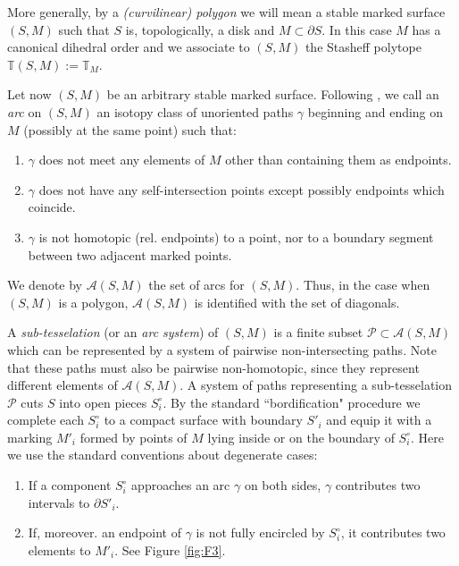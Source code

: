 \documentclass[english,11pt,leqno]{article}
\def\TT{{\mathbb{T}}}
\def\Ac{\mathcal{A}}
\def\Pc{\mathcal{P}}
\theoremstyle{definition}
\theoremstyle{remark}
\numberwithin{equation}{section}
\begin{document}
 More generally, by a {\em (curvilinear) polygon} we will mean a stable marked
 surface $(S,M)$ such that $S$ is, topologically,  a disk and $M\subset\partial S$. In  this
 case $M$ has a canonical dihedral order and we associate to $(S,M)$ the
 Stasheff polytope $\TT(S,M):= \TT_M$. 
 
 Let now $(S,M)$ be an arbitrary stable marked surface. Following \cite{harer, fomin-shapiro-thurston},
 we call an {\em arc} on $(S,M)$ an isotopy class of unoriented paths $\gamma$ beginning
 and ending on $M$ (possibly at the same point) such that:
 \begin{enumerate}
 \item[(1)] $\gamma$ does not meet any  elements of $M$ other than containing them as endpoints.
 
 \item[(2)] $\gamma$ does not have any self-intersection points  except possibly endpoints which
 coincide. 
 
 \item[(3)] $\gamma$ is not homotopic (rel. endpoints) to a point, nor to a boundary segment
 between two adjacent marked points. 
 
 \end{enumerate}
 
 We denote by $\Ac(S,M)$ the set of arcs for $(S,M)$. Thus, in the case when $(S,M)$ is a polygon, $\Ac(S,M)$
 is identified with the set of diagonals.
 
 A {\em sub-tesselation} (or an {\em arc system}) of $(S,M)$ is a finite subset $\Pc\subset \Ac(S,M)$ which can
 be represented by a system of pairwise non-intersecting paths. Note that these paths must also be 
 pairwise non-homotopic, since they represent different elements of $\Ac(S,M)$. A system of paths
 representing a sub-tesselation $\Pc$
 cuts $S$ into open pieces $S_i^\circ$. By the standard ``bordification" procedure we complete
 each $S_i^\circ$ to a compact surface with boundary $S'_i$ and equip it with a marking
 $M'_i$ formed by points of $M$ lying inside or on the boundary of $S_i^\circ$. Here we use the standard 
 conventions about degenerate cases:
 \begin{enumerate}
 \item[(1)] If a component $S_i^\circ$ approaches an arc $\gamma$ on both sides, $\gamma$ contributes two
 intervals to $\partial S'_i$.
 
 \item[(2)] If, moreover. an endpoint of $\gamma$ is not fully encircled by $S^\circ_i$, it contributes two
 elements to $M'_i$. See Figure \ref{fig:F3}. 
 \end{enumerate}
 
\end{document}
